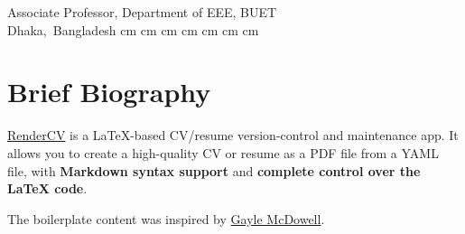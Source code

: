 \documentclass[cvauthor={Dr. Sajid Muhaimin Choudhury}]{buetcv}
\begin{document}
    \placelastupdatedtext %
    \begin{header}
        \fontsize{30 pt}{30 pt}
        \textbf{\cvauthor}

        \vspace{0.2 cm}
        \fontsize{20 pt}{20 pt}
        Associate Professor, Department of EEE, BUET \\
        \vspace{0.2 cm}        
        \normalsize
        \mbox{{\footnotesize\faMapMarker*}\hspace*{0.13cm}Dhaka, Bangladesh}%
         cm%
        \AND%
         cm%
        \mbox{}%
         cm%
        \AND%
         cm%
        \mbox{}%
         cm%
        \AND%
         cm%
        \mbox{}%
         cm%
    \end{header}

    \vspace{0.3 cm - 0.3 cm}


    \section{Brief Biography}
        \begin{onecolentry}
            \href{https://rendercv.com}{RenderCV} is a LaTeX-based CV/resume version-control and maintenance app. It allows you to create a high-quality CV or resume as a PDF file from a YAML file, with \textbf{Markdown syntax support} and \textbf{complete control over the LaTeX code}.
        \end{onecolentry}

        \vspace{0.2 cm}

        \begin{onecolentry}
            The boilerplate content was inspired by \href{https://github.com/dnl-blkv/mcdowell-cv}{Gayle McDowell}.
        \end{onecolentry}
\end{document}
